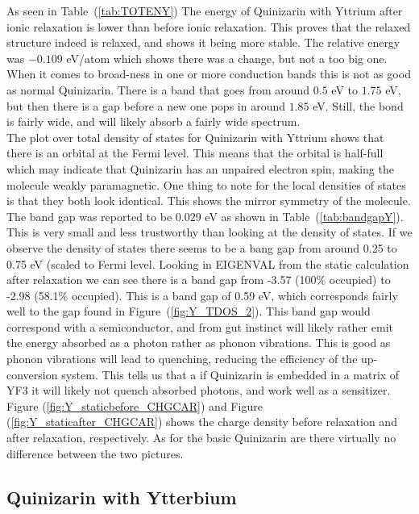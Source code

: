 \documentclass{article}
\begin{document}
    As seen in Table~(\ref{tab:TOTENY}) The energy of Quinizarin with Yttrium after ionic relaxation is lower than before ionic relaxation. This proves that the relaxed structure indeed is relaxed, and shows it being more stable. The relative energy was $-0.109$ eV/atom which shows there was a change, but not a too big one. When it comes to broad-ness in one or more conduction bands this is not as good as normal Quinizarin. There is a band that goes from around $0.5$ eV  to $1.75$ eV, but then there is a gap before a new one pops in around $1.85$ eV. Still, the bond is fairly wide, and will likely absorb a fairly wide spectrum. \\

    The plot over total density of states for Quinizarin with Yttrium shows that there is an orbital at the Fermi level. This means that the orbital is half-full which may indicate that Quinizarin has an unpaired electron spin, making the molecule weakly paramagnetic. One thing to note for the local densities of states is that they both look identical. This shows the mirror symmetry of the molecule. \\

    The band gap was reported to be $0.029$ eV as shown in Table~(\ref{tab:bandgapY}). This is very small and less trustworthy than looking at the density of states. If we observe the density of states there seems to be a bang gap from around 0.25 to 0.75 eV (scaled to Fermi level. Looking in EIGENVAL from the static calculation after relaxation we can see there is a band gap from -3.57 (100\% occupied) to -2.98 (58.1\% occupied). This is a band gap of 0.59 eV, which corresponds fairly well to the gap found in Figure~(\ref{fig:Y_TDOS_2}). This band gap would correspond with a semiconductor, and from gut instinct will likely rather emit the energy absorbed as a photon rather as phonon vibrations. This is good as phonon vibrations will lead to quenching, reducing the efficiency of the up-conversion system. This tells us that a if Quinizarin is embedded in a matrix of YF3 it will likely not quench absorbed photons, and work well as a sensitizer. \\

    Figure (\ref{fig:Y_staticbefore_CHGCAR}) and Figure (\ref{fig:Y_staticafter_CHGCAR}) shows the charge density before relaxation and after relaxation, respectively. As for the basic Quinizarin are there virtually no difference between the two pictures. \\

  \subsection{Quinizarin with Ytterbium}
\end{document}
